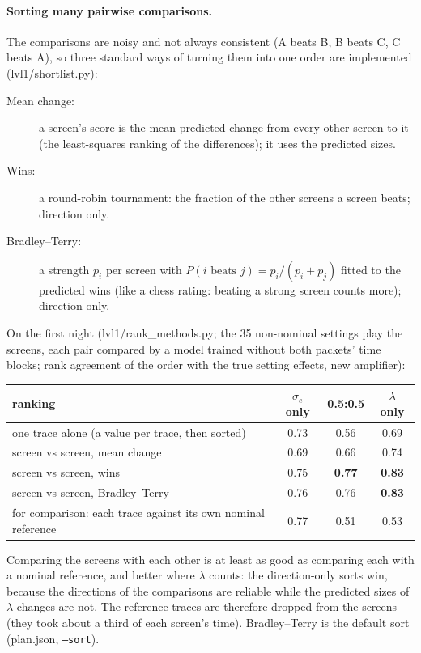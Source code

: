 \documentclass[11pt]{article}
\begin{document}
\paragraph{Sorting many pairwise comparisons.} The comparisons are noisy and not always consistent (A beats B, B beats
C, C beats A), so three standard ways of turning them into one order are implemented (lvl1/shortlist.py):
\begin{description}
\item[Mean change:] a screen's score is the mean predicted change from every other screen to it (the least-squares
  ranking of the differences); it uses the predicted sizes.
\item[Wins:] a round-robin tournament: the fraction of the other screens a screen beats; direction only.
\item[Bradley--Terry:] a strength $p_i$ per screen with $P(i\text{ beats }j)=p_i/(p_i+p_j)$ fitted to the predicted wins
  (like a chess rating: beating a strong screen counts more); direction only.
\end{description}
On the first night (lvl1/rank\_methods.py; the 35 non-nominal settings play the screens, each pair compared by a model
trained without both packets' time blocks; rank agreement of the order with the true setting effects, new amplifier):
\begin{center}\small
\begin{tabular}{lccc}\toprule
ranking & $\sigma_e$ only & 0.5:0.5 & $\lambda$ only\\\midrule
one trace alone (a value per trace, then sorted) & 0.73 & 0.56 & 0.69\\
screen vs screen, mean change & 0.69 & 0.66 & 0.74\\
screen vs screen, wins & 0.75 & \textbf{0.77} & \textbf{0.83}\\
screen vs screen, Bradley--Terry & 0.76 & 0.76 & \textbf{0.83}\\
for comparison: each trace against its own nominal reference & 0.77 & 0.51 & 0.53\\\bottomrule
\end{tabular}
\end{center}
Comparing the screens with each other is at least as good as comparing each with a nominal reference, and better where
$\lambda$ counts: the direction-only sorts win, because the directions of the comparisons are reliable while the
predicted sizes of $\lambda$ changes are not. The reference traces are therefore dropped from the screens (they took
about a third of each screen's time). Bradley--Terry is the default sort (plan.json, \texttt{--sort}).
\end{document}
